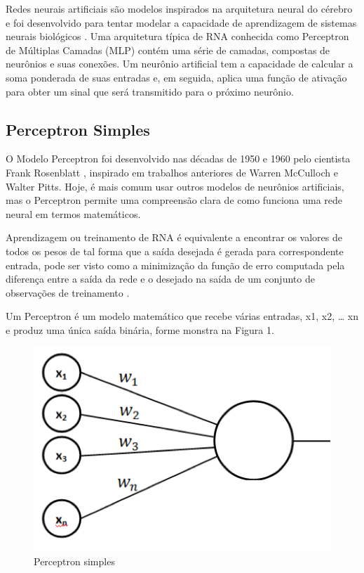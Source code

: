 \documentclass[conference]{IEEEtran}
\begin{document}
	Redes neurais artificiais são modelos inspirados na arquitetura neural do cérebro e foi desenvolvido para tentar modelar a capacidade de aprendizagem de sistemas neurais biológicos \cite{b4}. Uma arquitetura típica de RNA conhecida como Perceptron de Múltiplas Camadas (MLP) contém uma série de camadas, compostas de neurônios e suas conexões. Um neurônio artificial tem a capacidade de calcular a soma ponderada de suas entradas e, em seguida, aplica uma função de ativação para obter um sinal que será transmitido para o próximo neurônio.
	
	\subsection{Perceptron Simples}
	O Modelo Perceptron foi desenvolvido nas décadas de 1950 e 1960 pelo cientista Frank Rosenblatt \cite{b9}, inspirado em trabalhos anteriores de Warren McCulloch e Walter Pitts. Hoje, é mais comum usar outros modelos de neurônios artificiais, mas o Perceptron permite uma compreensão clara de como funciona uma rede neural em termos matemáticos.
	
	
    Aprendizagem ou treinamento de RNA é equivalente a encontrar os valores de todos os pesos de tal forma que a saída desejada é gerada para correspondente entrada, pode ser visto como a minimização da função de erro computada pela diferença entre a saída da rede e o desejado na saída de um conjunto de observações de treinamento \cite{b6}.
	
	Um Perceptron é um modelo matemático que recebe várias entradas, x1, x2, … xn e produz uma única saída binária, forme monstra na Figura 1.
	
	\begin{figure}[htbp]
	\centerline{\includegraphics[scale=1]{Perceptron.png}}
	\caption{Perceptron simples}
	\label{fig}
	\end{figure}
	
\end{document}
